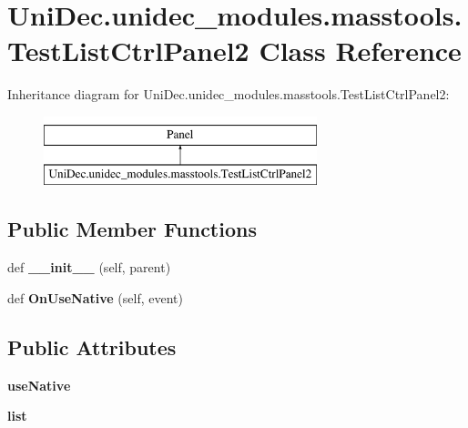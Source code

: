 \hypertarget{class_uni_dec_1_1unidec__modules_1_1masstools_1_1_test_list_ctrl_panel2}{}\section{Uni\+Dec.\+unidec\+\_\+modules.\+masstools.\+Test\+List\+Ctrl\+Panel2 Class Reference}
\label{class_uni_dec_1_1unidec__modules_1_1masstools_1_1_test_list_ctrl_panel2}
Inheritance diagram for Uni\+Dec.\+unidec\+\_\+modules.\+masstools.\+Test\+List\+Ctrl\+Panel2\+:\begin{figure}[H]
\begin{center}
\leavevmode
\includegraphics[height=2.000000cm]{class_uni_dec_1_1unidec__modules_1_1masstools_1_1_test_list_ctrl_panel2}
\end{center}
\end{figure}
\subsection*{Public Member Functions}
\begin{DoxyCompactItemize}
\item 
\hypertarget{class_uni_dec_1_1unidec__modules_1_1masstools_1_1_test_list_ctrl_panel2_a7eec791dce2846fcdefa5358c9e5df70}{}def {\bfseries \+\_\+\+\_\+init\+\_\+\+\_\+} (self, parent)\label{class_uni_dec_1_1unidec__modules_1_1masstools_1_1_test_list_ctrl_panel2_a7eec791dce2846fcdefa5358c9e5df70}

\item 
\hypertarget{class_uni_dec_1_1unidec__modules_1_1masstools_1_1_test_list_ctrl_panel2_a622314cc6e59371071c379e6824934e1}{}def {\bfseries On\+Use\+Native} (self, event)\label{class_uni_dec_1_1unidec__modules_1_1masstools_1_1_test_list_ctrl_panel2_a622314cc6e59371071c379e6824934e1}

\end{DoxyCompactItemize}
\subsection*{Public Attributes}
\begin{DoxyCompactItemize}
\item 
\hypertarget{class_uni_dec_1_1unidec__modules_1_1masstools_1_1_test_list_ctrl_panel2_aebf8575d9ffad0fa2dd91a639eaa5ba1}{}{\bfseries use\+Native}\label{class_uni_dec_1_1unidec__modules_1_1masstools_1_1_test_list_ctrl_panel2_aebf8575d9ffad0fa2dd91a639eaa5ba1}

\item 
\hypertarget{class_uni_dec_1_1unidec__modules_1_1masstools_1_1_test_list_ctrl_panel2_addc3cd73b431a78a51fb03e5bd63b533}{}{\bfseries list}\label{class_uni_dec_1_1unidec__modules_1_1masstools_1_1_test_list_ctrl_panel2_addc3cd73b431a78a51fb03e5bd63b533}

\end{DoxyCompactItemize}


